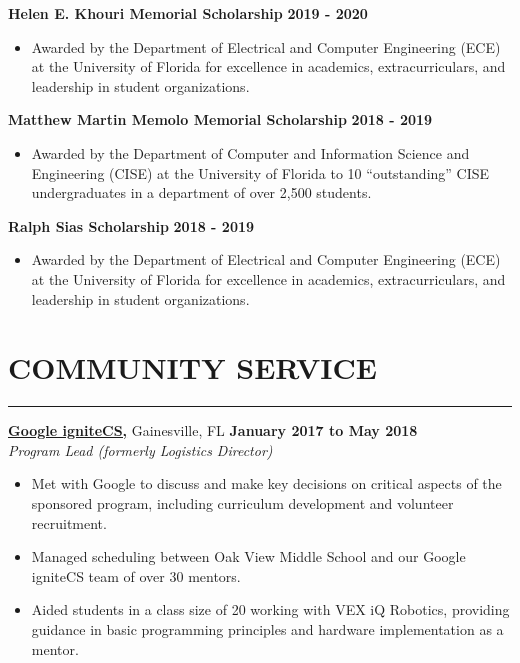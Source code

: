 \documentclass[11pt]{article} %
\begin{document}
	\noindent\textbf{Helen E. Khouri Memorial Scholarship} \hfill\textbf{2019 - 2020}
	\begin{itemize}[noitemsep,nolistsep, label={-}]
		\item Awarded by the Department of Electrical and Computer Engineering (ECE) at the University of Florida for excellence in academics, extracurriculars, and leadership in student organizations.
	\end{itemize}
	\vspace{.20cm}
	
	\noindent\textbf{Matthew Martin Memolo Memorial Scholarship} \hfill\textbf{2018 - 2019}
	\begin{itemize}[noitemsep,nolistsep, label={-}]
		\item Awarded by the Department of Computer and Information Science and Engineering (CISE) at the University of Florida to 10 ``outstanding'' CISE undergraduates in a department of over 2,500 students.
	\end{itemize}
	\vspace{.20cm}

	\noindent\textbf{Ralph Sias Scholarship} \hfill\textbf{2018 - 2019}
	\begin{itemize}[noitemsep,nolistsep, label={-}]
		\item Awarded by the Department of Electrical and Computer Engineering (ECE) at the University of Florida for excellence in academics, extracurriculars, and leadership in student organizations.
	\end{itemize}
	\pagebreak
	
	\section*{COMMUNITY SERVICE}
	\hrule \relax
	\vspace{.4cm}

	\noindent \href{https://sites.google.com/view/ignitecs/home}{\textbf{Google igniteCS,}} Gainesville, FL \hfill\textbf{January 2017 to May 2018}\\
	\textit{Program Lead (formerly Logistics Director)}
	\begin{itemize}[noitemsep,nolistsep, label = {-}]
		\item Met with Google to discuss and make key decisions on critical aspects of the sponsored program, including curriculum development and volunteer recruitment.
		\item Managed scheduling between Oak View Middle School and our Google igniteCS team of over 30 mentors.
		\item Aided students in a class size of 20 working with VEX iQ Robotics, providing guidance in basic programming principles and hardware implementation as a mentor.
	\end{itemize} 
	\vspace{.20cm}
	
\end{document}
